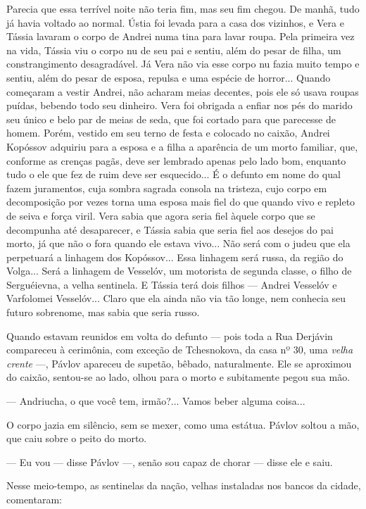Parecia que essa terrível noite não teria fim, mas seu fim chegou. De
manhã, tudo já havia voltado ao normal. Ústia foi levada para a casa dos
vizinhos, e Vera e Tássia lavaram o corpo de Andrei numa tina para lavar
roupa. Pela primeira vez na vida, Tássia viu o corpo nu de seu pai e
sentiu, além do pesar de filha, um constrangimento desagradável. Já Vera
não via esse corpo nu fazia muito tempo e sentiu, além do pesar de
esposa, repulsa e uma espécie de horror... Quando começaram a vestir
Andrei, não acharam meias decentes, pois ele só usava roupas puídas,
bebendo todo seu dinheiro. Vera foi obrigada a enfiar nos pés do marido
seu único e belo par de meias de seda, que foi cortado para que
parecesse de homem. Porém, vestido em seu terno de festa e colocado no
caixão, Andrei Kopóssov adquiriu para a esposa e a filha a aparência de
um morto familiar, que, conforme as crenças pagãs, deve ser lembrado
apenas pelo lado bom, enquanto tudo o ele que fez de ruim deve ser
esquecido... É o defunto em nome do qual fazem juramentos, cuja sombra
sagrada consola na tristeza, cujo corpo em decomposição por vezes torna
uma esposa mais fiel do que quando vivo e repleto de seiva e força
viril. Vera sabia que agora seria fiel àquele corpo que se decompunha
até desaparecer, e Tássia sabia que seria fiel aos desejos do pai morto,
já que não o fora quando ele estava vivo... Não será com o judeu que ela
perpetuará a linhagem dos Kopóssov... Essa linhagem será russa, da
região do Volga... Será a linhagem de Vesselóv, um motorista de segunda
classe, o filho de Serguéievna, a velha sentinela. E Tássia terá dois
filhos --- Andrei Vesselóv e Varfolomei Vesselóv... Claro que ela ainda
não via tão longe, nem conhecia seu futuro sobrenome, mas sabia que
seria russo.

Quando estavam reunidos em volta do defunto --- pois toda a Rua Derjávin
compareceu à cerimônia, com exceção de Tchesnokova, da casa nº 30, uma
\emph{velha crente} ---, Pávlov apareceu de supetão, bêbado,
naturalmente. Ele se aproximou do caixão, sentou-se ao lado, olhou para
o morto e subitamente pegou sua mão.

--- Andriucha, o que você tem, irmão?... Vamos beber alguma coisa...

O corpo jazia em silêncio, sem se mexer, como uma estátua. Pávlov soltou
a mão, que caiu sobre o peito do morto.

--- Eu vou --- disse Pávlov ---, senão sou capaz de chorar --- disse ele
e saiu.

Nesse meio-tempo, as sentinelas da nação, velhas instaladas nos bancos
da cidade, comentaram:


